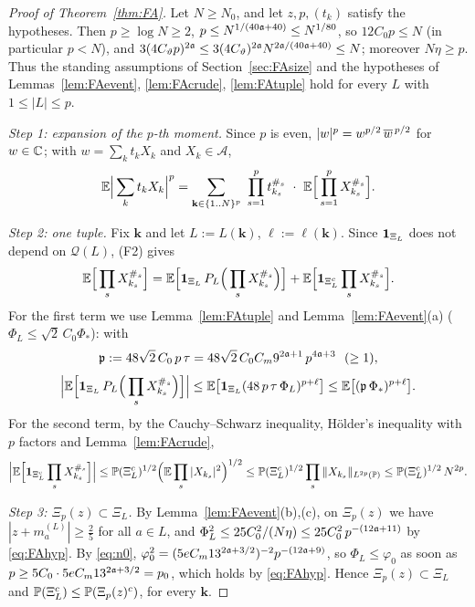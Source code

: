 \begin{proof}[Proof of Theorem~\ref{thm:FA}]
Let $N\ge N_0$, and let $z,p,(t_k)$ satisfy the hypotheses. Then $p\ge\log N\ge2$, $p\le N^{1/(40\mathfrak{a}+40)}\le N^{1/80}$, so $12C_0p\le N$ (in particular $p<N$), and $3(4C_\vartheta p)^{2\mathfrak{a}}\le3(4C_\vartheta)^{2\mathfrak{a}}N^{2\mathfrak{a}/(40\mathfrak{a}+40)}\le N$; moreover $N\eta\ge p$.
Thus the standing assumptions of Section~\ref{sec:FAsize} and the hypotheses of Lemmas~\ref{lem:FAevent}, \ref{lem:FAcrude}, \ref{lem:FAtuple} hold for every $L$ with $1\le|L|\le p$.

\emph{Step 1: expansion of the $p$-th moment.} Since $p$ is even, $|w|^p=w^{p/2}\,\overline{w}^{\,p/2}$ for $w\in\mathbb{C}$; with $w=\sum_kt_kX_k$ and $X_k\in\mathcal A$,
\begin{equation}\label{eq:pf1}
 \EE\Big|\sum_kt_kX_k\Big|^p=\sum_{\mathbf k\in\{1..N\}^p}\ \prod_{s=1}^pt_{k_s}^{\#_s}\ \cdot\ \EE\Big[\prod_{s=1}^pX_{k_s}^{\#_s}\Big].
\end{equation}

\emph{Step 2: one tuple.} Fix $\mathbf k$ and let $L:=L(\mathbf k)$, $\ell:=\ell(\mathbf k)$. Since $\mathbf{1}_{\Xi_L}$ does not depend on $\mathcal Q(L)$, (F2) gives
\begin{equation}\label{eq:pf2}
 \mathbb{E}\Big[\prod_sX_{k_s}^{\#_s}\Big]=\mathbb{E}\Big[\mathbf{1}_{\Xi_L}\,P_L\Big(\prod_sX_{k_s}^{\#_s}\Big)\Big]+\mathbb{E}\Big[\mathbf{1}_{\Xi_L^c}\prod_sX_{k_s}^{\#_s}\Big].
\end{equation}
For the first term we use Lemma~\ref{lem:FAtuple} and Lemma~\ref{lem:FAevent}(a) ($\Phi_L\le\sqrt2\,C_0\Phi_*$): with
\[
 \mathfrak p:=48\sqrt2\,C_0\,p\,\tau=48\sqrt2\,C_0C_m9^{2\fa+1}\,p^{4\fa+3}\ \ (\ge1),
\]
\begin{equation}\label{eq:pf3}
 \Big|\mathbb{E}\Big[\mathbf{1}_{\Xi_L}\,P_L\Big(\prod_sX_{k_s}^{\#_s}\Big)\Big]\Big|\le\mathbb{E}\big[\mathbf{1}_{\Xi_L}(48\,p\,\tau\,\Phi_L)^{p+\ell}\big]\le\mathbb{E}\big[(\mathfrak p\,\Phi_*)^{p+\ell}\big].
\end{equation}
For the second term, by the Cauchy--Schwarz inequality, H\"older's inequality with $p$ factors and Lemma~\ref{lem:FAcrude},
\begin{equation}\label{eq:pf4}
 \Big|\mathbb{E}\Big[\mathbf{1}_{\Xi_L^c}\prod_sX_{k_s}^{\#_s}\Big]\Big|\le\mathbb{P}(\Xi_L^c)^{1/2}\Big(\mathbb{E}\prod_s|X_{k_s}|^2\Big)^{1/2}\le\mathbb{P}(\Xi_L^c)^{1/2}\prod_s\|X_{k_s}\|_{L^{2p}(\mathbb{P})}\le\mathbb{P}(\Xi_L^c)^{1/2}\,N^{2p}.
\end{equation}

\emph{Step 3: $\Xi_p(z)\subset\Xi_L$.} By Lemma~\ref{lem:FAevent}(b),(c), on $\Xi_p(z)$ we have $|z+m_a^{(L)}|\ge\frac25$ for all $a\in L$, and $\Phi_L^2\le25C_0^2/(N\eta)\le25C_0^2\,p^{-(12\mathfrak{a}+11)}$ by \eqref{eq:FAhyp}. By \eqref{eq:n0}, $\varphi_0^2=(5eC_m13^{2\mathfrak{a}+3/2})^{-2}p^{-(12\mathfrak{a}+9)}$, so
$\Phi_L\le\varphi_0$ as soon as $p\ge5C_0\cdot5eC_m13^{2\mathfrak{a}+3/2}=p_0$, which holds by \eqref{eq:FAhyp}. Hence $\Xi_p(z)\subset\Xi_L$ and $\mathbb{P}(\Xi_L^c)\le\mathbb{P}(\Xi_p(z)^c)$, for every $\mathbf k$.


\end{proof}
